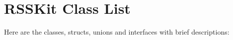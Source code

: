 \section{RSSKit Class List}
Here are the classes, structs, unions and interfaces with brief descriptions:\begin{CompactList}
\item{}
\item{}
\item{}
\end{CompactList}
